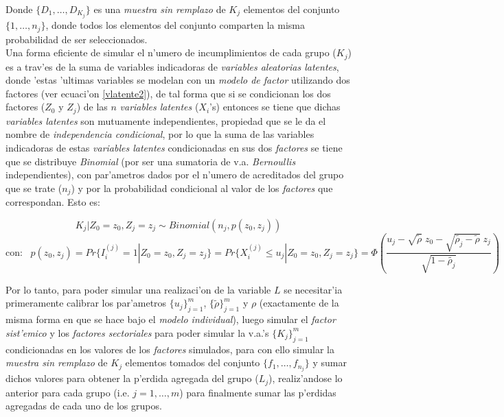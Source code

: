 \documentclass[10pt, oneside]{article}
\begin{document}
\begin{enumerate}
\noindent
Donde $\{D_1,\ldots, D_{K_j}\}$ es una \emph{muestra sin remplazo} de $K_j$ elementos del conjunto $\{1, \ldots, n_j\}$, donde todos los elementos del conjunto comparten la misma probabilidad de ser seleccionados.\\

\noindent
Una forma eficiente de simular el n'umero de incumplimientos de cada grupo ($K_j$) es a trav'es de la suma de variables indicadoras de \emph{variables aleatorias latentes}, donde 'estas 'ultimas variables se modelan con un \emph{modelo de factor} utilizando dos factores (ver ecuaci'on \ref{vlatente2}), de tal forma que si se condicionan los dos factores ($Z_0$ y $Z_j$) de las $n$ \emph{variables latentes} ($X_i$'s) entonces se tiene que dichas \emph{variables latentes} son mutuamente independientes, propiedad que se le da el nombre de \emph{independencia condicional}, por lo que la suma de las variables indicadoras de estas \emph{variables latentes} condicionadas en sus dos \emph{factores} se tiene que se distribuye \emph{Binomial} (por ser una sumatoria de v.a. \emph{Bernoullis} independientes), con par'ametros dados por el n'umero de acreditados del grupo que se trate ($n_j$) y por la probabilidad condicional al valor de los \emph{factores} que correspondan. Esto es:

\[K_j|Z_0 = z_0, Z_j = z_j \sim Binomial(n_j,p(z_0, z_j)) \]
\[\mbox{con:}\;\;\; p(z_0, z_j) = Pr\{I_i^{(j)} = 1 | Z_0 = z_0, Z_j = z_j\} =Pr\{X_i^{(j)} \leq u_j | Z_0 = z_0, Z_j = z_j\} = \Phi \left( \frac{u_j-\sqrt{\widetilde{\rho}}\;z_0-\sqrt{\widetilde{\rho_j}-\widetilde{\rho}} \;z_j}{\sqrt{1-\widetilde{\rho_j}}} \right) \]

\noindent
Por lo tanto, para poder simular una realizaci'on de la variable $L$ se necesitar'ia primeramente calibrar los par'ametros $\{u_j\}_{j=1}^m$,  $\{\widetilde{\rho}\}_{j=1}^m$ y $\rho$ (exactamente de la misma forma en que se hace bajo el \emph{modelo individual}), luego simular el \emph{factor sist'emico} y los \emph{factores sectoriales} para poder simular la v.a.'s $\{K_j\}_{j=1}^{m}$ condicionadas en los valores de los \emph{factores} simulados, para con ello simular la \emph{muestra sin remplazo} de $K_j$ elementos tomados del conjunto $\{f_1, \ldots, f_{n_j}\}$ y sumar dichos valores para obtener la p'erdida agregada del grupo ($L_j$), realiz'andose lo anterior para cada grupo (i.e. $j = 1, \ldots, m$) para finalmente sumar las p'erdidas agregadas de cada uno de los grupos.\\

\end{enumerate}
\end{document}

